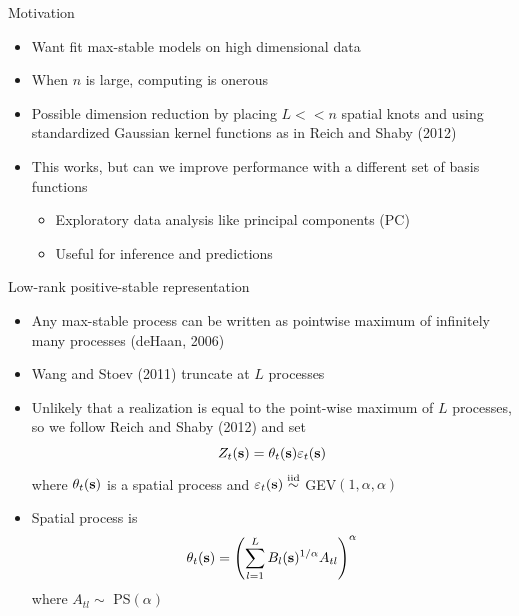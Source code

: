 \documentclass{beamer}
\begin{document}
\begin{frame}{Motivation}
	\begin{itemize} \setlength{\itemsep}{1em}
		\item Want fit max-stable models on high dimensional data
		\item When $n$ is large, computing is onerous
		\item Possible dimension reduction by placing $L << n$ spatial knots and using standardized Gaussian kernel functions as in Reich and Shaby (2012) \vspace{0.5em}
		\item This works, but can we improve performance with a different set of basis functions \vspace{0.5em}
		\begin{itemize} \setlength{\itemsep}{0.5em}
			\item Exploratory data analysis like principal components (PC)
			\item Useful for inference and predictions
		\end{itemize}
	\end{itemize}
\end{frame}

\begin{frame}{Low-rank positive-stable representation}
	\begin{itemize} \setlength{\itemsep}{1em}
		\item Any max-stable process can be written as pointwise maximum of infinitely many processes (deHaan, 2006)
		\item Wang and Stoev (2011) truncate at $L$ processes
		\item Unlikely that a realization is equal to the point-wise maximum of $L$ processes, so we follow Reich and Shaby (2012) and set $$Z_t(\mathbf{s}) = \theta_t(\mathbf{s}) \varepsilon_t(\mathbf{s})$$ where $\theta_t(\mathbf{s})$ is a spatial process and $\varepsilon_t(\mathbf{s}) \stackrel{\mathrm{iid}}{\sim}$ GEV$(1, \alpha, \alpha)$
		\item Spatial process is $$\theta_t(\mathbf{s}) = \left( \sum_{l = 1}^L B_l(\mathbf{s})^{1 / \alpha} A_{tl} \right)^\alpha$$ where $A_{tl} \sim$ PS$(\alpha)$
	\end{itemize}
\end{frame}
\end{document}
